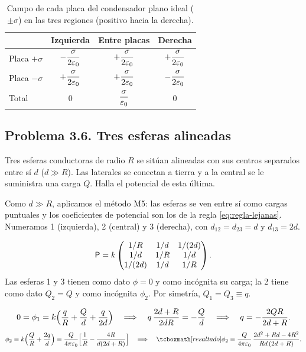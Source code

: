 \begin{table}[ht]
\centering
\caption{Campo de cada placa del condensador plano ideal ($\pm\sigma$) en las tres regiones (positivo hacia la derecha).}
\label{tab:sem-plano}
\begin{tabular}{@{}lccc@{}}
  \toprule
  & Izquierda & Entre placas & Derecha\\
  \midrule
  Placa $+\sigma$ & $-\dfrac{\sigma}{2\varepsilon_{0}}$ & $+\dfrac{\sigma}{2\varepsilon_{0}}$ & $+\dfrac{\sigma}{2\varepsilon_{0}}$\\[8pt]
  Placa $-\sigma$ & $+\dfrac{\sigma}{2\varepsilon_{0}}$ & $+\dfrac{\sigma}{2\varepsilon_{0}}$ & $-\dfrac{\sigma}{2\varepsilon_{0}}$\\[6pt]
  \midrule
  Total & $0$ & $\dfrac{\sigma}{\varepsilon_{0}}$ & $0$\\[6pt]
  \bottomrule
\end{tabular}
\end{table}

\subsection{Problema 3.6. Tres esferas alineadas}\label{sem:alineadas}
\begin{problema}\label{prob:alineadas}
Tres esferas conductoras de radio $R$ se sitúan alineadas con sus centros separados entre sí $d$ ($d\gg R$). Las laterales se conectan a tierra y a la central
se le suministra una carga $Q$. Halla el potencial de esta última.
\end{problema}

\begin{resolucion}
 Como $d\gg R$, aplicamos el método M5: las esferas se ven entre sí como cargas puntuales y los coeficientes de potencial son los de la regla
\eqref{eq:regla-lejanas}. Numeramos 1 (izquierda), 2 (central) y 3 (derecha), con $d_{12}=d_{23}=d$ y $d_{13}=2d$.

\[
  \mathsf{P}=k\begin{pmatrix}1/R & 1/d & 1/(2d)\\ 1/d & 1/R & 1/d\\ 1/(2d) & 1/d & 1/R\end{pmatrix}.
\]
 Las esferas 1 y 3 tienen como dato $\phi=0$ y como incógnita su carga; la 2 tiene como dato $Q_2=Q$ y como incógnita $\phi_2$. Por
simetría, $Q_1=Q_3\equiv q$.

\[
  0=\phi_1=k\Bigl(\frac{q}{R}+\frac{Q}{d}+\frac{q}{2d}\Bigr)\quad\Longrightarrow\quad q\,\frac{2d+R}{2dR}=-\frac{Q}{d}
  \quad\Longrightarrow\quad q=-\frac{2QR}{2d+R}.
\]
\[
  \phi_2=\kc\Bigl(\frac{Q}{R}+\frac{2q}{d}\Bigr)=\frac{Q}{4\pi\eo}\Bigl[\frac1R-\frac{4R}{d(2d+R)}\Bigr]
  \quad\Longrightarrow\quad\resalta{\phi_2=\frac{Q}{4\pi\eo}\,\frac{2d^{2}+Rd-4R^{2}}{Rd\,(2d+R)} .}
\]
\end{resolucion}

